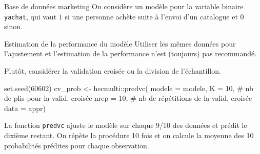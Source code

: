 \documentclass[
  ignorenonframetext,
]{beamer}
\newenvironment{Shaded}{\begin{snugshade}}{\end{snugshade}}
\newcommand{\AttributeTok}[1]{\textcolor[rgb]{0.40,0.45,0.13}{#1}}
\newcommand{\CommentTok}[1]{\textcolor[rgb]{0.37,0.37,0.37}{#1}}
\newcommand{\DecValTok}[1]{\textcolor[rgb]{0.68,0.00,0.00}{#1}}
\newcommand{\FunctionTok}[1]{\textcolor[rgb]{0.28,0.35,0.67}{#1}}
\newcommand{\NormalTok}[1]{\textcolor[rgb]{0.00,0.23,0.31}{#1}}
\newcommand{\OtherTok}[1]{\textcolor[rgb]{0.00,0.23,0.31}{#1}}
\newcommand{\SpecialCharTok}[1]{\textcolor[rgb]{0.37,0.37,0.37}{#1}}
\newcommand{\StringTok}[1]{\textcolor[rgb]{0.13,0.47,0.30}{#1}}
\begin{document}
\begin{frame}[fragile]{Base de données marketing}
\protect\hypertarget{base-de-donnuxe9es-marketing}{}
On considère un modèle pour la variable binaire \texttt{yachat}, qui
vaut \(1\) si une personne achète suite à l'envoi d'un catalogue et
\(0\) sinon.

\begin{Shaded}
\end{Shaded}
\end{frame}

\begin{frame}[fragile]{Estimation de la performance du modèle}
\protect\hypertarget{estimation-de-la-performance-du-moduxe8le}{}
Utiliser les mêmes données pour l'ajustement et l'estimation de la
performance n'est (toujours) pas recommandé.

Plutôt, considérer la validation croisée ou la division de
l'échantillon.

\begin{Shaded}
\begin{Highlighting}[numbers=left,,]
\FunctionTok{set.seed}\NormalTok{(}\DecValTok{60602}\NormalTok{)}
\NormalTok{cv\_prob }\OtherTok{\textless{}{-}}\NormalTok{ hecmulti}\SpecialCharTok{::}\FunctionTok{predvc}\NormalTok{(}
  \AttributeTok{modele =}\NormalTok{ modele,  }
  \AttributeTok{K =} \DecValTok{10}\NormalTok{, }\CommentTok{\# nb de plis pour la valid. croisée}
  \AttributeTok{nrep =} \DecValTok{10}\NormalTok{, }\CommentTok{\# nb de répétitions de la valid. croisée}
  \AttributeTok{data =}\NormalTok{ appr)}
\end{Highlighting}
\end{Shaded}

\footnotesize

La fonction \texttt{predvc} ajuste le modèle sur chaque 9/10 des données
et prédit le dixième restant. On répète la procédure 10 fois et on
calcule la moyenne des 10 probabilités prédites pour chaque observation.

\normalsize
\end{frame}
\end{document}
